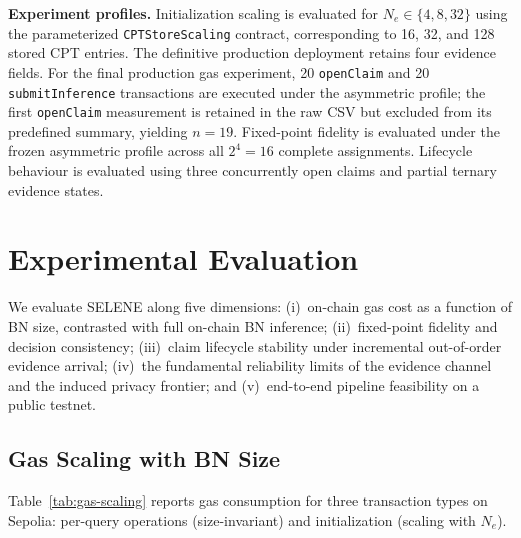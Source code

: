 \documentclass[journal]{IEEEtran}
\theoremstyle{definition}
\theoremstyle{remark}
\begin{document}
\noindent\textbf{Experiment profiles.}
Initialization scaling is evaluated for
$N_e\in\{4,8,32\}$ using the parameterized
\texttt{CPTStoreScaling} contract, corresponding to
16, 32, and 128 stored CPT entries. The definitive
production deployment retains four evidence fields.
For the final production gas experiment, 20
\texttt{openClaim} and 20 \texttt{submitInference}
transactions are executed under the asymmetric profile;
the first \texttt{openClaim} measurement is retained in
the raw CSV but excluded from its predefined summary,
yielding $n=19$. Fixed-point fidelity is evaluated under
the frozen asymmetric profile across all $2^4=16$
complete assignments. Lifecycle behaviour is evaluated
using three concurrently open claims and partial ternary
evidence states.


\section{Experimental Evaluation}
\label{sec:experimental-analysis}

We evaluate SELENE along five dimensions:
(i)~on-chain gas cost as a function of BN size,
contrasted with full on-chain BN inference;
(ii)~fixed-point fidelity and decision consistency;
(iii)~claim lifecycle stability under incremental
out-of-order evidence arrival;
(iv)~the fundamental reliability limits of the evidence
channel and the induced privacy frontier; and
(v)~end-to-end pipeline feasibility on a public
testnet.

\subsection{Gas Scaling with BN Size}
\label{sec:exp-bn-size}

Table~\ref{tab:gas-scaling} reports gas consumption for
three transaction types on Sepolia: per-query operations
(size-invariant) and initialization (scaling with $N_e$).
\end{document}
